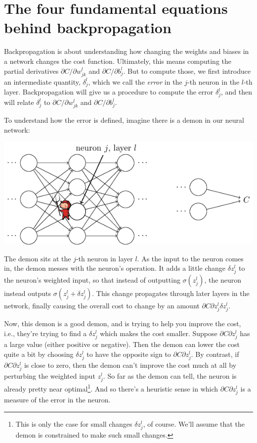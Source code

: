 \documentclass[a4paper,twoside,10pt]{book}
\begin{document}
\section{The four fundamental equations behind backpropagation}
Backpropagation is about understanding how changing the weights and biases in a network changes the cost function. Ultimately, this means computing the partial derivatives $\partial{}C/\partial{}w^l_{jk}$ and $\partial{}C/\partial{}b^l_j$. But to compute those, we first introduce an intermediate quantity, $\delta^l_j$, which we call the \textit{error} in the $j$-th neuron in the $l$-th layer. Backpropagation will give us a procedure to compute the error $\delta^l_j$, and then will relate $\delta^l_j$ to $\partial{}C/\partial{}w^l_{jk}$ and $\partial{}C/\partial{}b^l_j$.

To understand how the error is defined, imagine there is a demon in our neural network:

\begin{center}
	\includegraphics[width=0.5\linewidth]{./figures/ch2/tikz19}
\end{center}
The demon sits at the $j$-th neuron in layer $l$. As the input to the neuron comes in, the demon messes with the neuron's operation. It adds a little change $\delta{}z^l_j$ to the neuron's weighted input, so that instead of outputting $\sigma(z^l_j)$, the neuron instead outputs $\sigma(z^l_j+\delta{}z^l_j)$. This change propagates through later layers in the network, finally causing the overall cost to change by an amount $\partial{}C\partial{}z^l_j\delta{}z^l_j$.

Now, this demon is a good demon, and is trying to help you improve the cost, i.e., they're trying to find a $\delta{}z^l_j$ which makes the cost smaller. Suppose $\partial{}C\partial{}z^l_j$ has a large value (either positive or negative). Then the demon can lower the cost quite a bit by choosing $\delta{}z^l_j$ to have the opposite sign to $\partial{}C\partial{}z^l_j$. By contrast, if $\partial{}C\partial{}z^l_j$ is close to zero, then the demon can't improve the cost much at all by perturbing the weighted input $z^l_j$. So far as the demon can tell, the neuron is already pretty near optimal\footnote{This is only the case for small changes $\delta{}z^l_j$, of course. We'll assume that the demon is constrained to make such small changes.}. And so there's a heuristic sense in which $\partial{}C\partial{}z^l_j$ is a measure of the error in the neuron.
\end{document}
